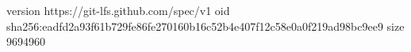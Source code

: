 version https://git-lfs.github.com/spec/v1
oid sha256:eadfd2a93f61b729fe86fe270160b16c52b4e407f12c58e0a0f219ad98bc9ee9
size 9694960
